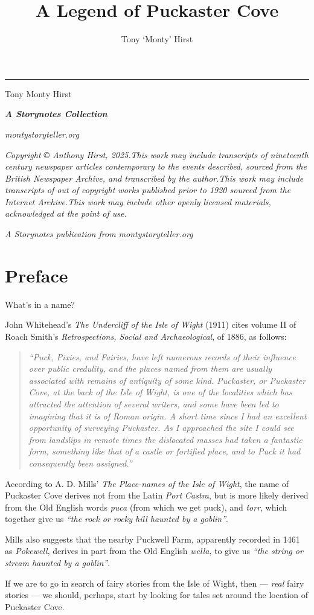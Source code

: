\documentclass[
  12pt,
  a5paper,
  twoside]{book}
\date{}
\title{A Legend of Puckaster Cove}
\author{Tony `Monty' Hirst}
\date{}
\makeatletter
\let\origtableofcontents\tableofcontents
\renewcommand{\tableofcontents}{%
    \cleardoublepage
    \pagestyle{plain}
    \origtableofcontents
    \cleardoublepage
    \pagestyle{normal} 
  }
\renewcommand{\maketitle}{%
  \thispagestyle{plain}
  \noindent\rule{\linewidth}{1pt}\par
  \begingroup
    \hypersetup{pdfauthor={\@author}, pdftitle={\@title}}%
  \endgroup
  \begin{flushright}
    \vspace{48pt}
    {\headingfont
    {\fontsize{44pt}{56pt}\selectfont \setlength{\baselineskip}{56pt}%
    \@title\par}
    \vspace{96pt}
    {\Large Tony {\textquotesingle}Monty{\textquotesingle} Hirst}\par
    
    \vspace{25pt}
    \@date \par

    }
  \end{flushright}

  \newpage
  \thispagestyle{plain}
  \thispagestyle{empty}

  \makeatletter

  \vspace*{\fill}

  \begin{center}
  {\large \textbf{\textit{A Storynotes Collection}}}\\[2em]
  \end{center}

  \vfill

  \begin{center}
  \large \textit{montystoryteller.org}
  \end{center}

  \vspace{2cm}

  \begin{center}
  \textit{Copyright {\copyright} Anthony Hirst, 2025.\linebreak\linebreak This work may include transcripts of nineteenth century newspaper articles contemporary to the events described, sourced from the British Newspaper Archive, and transcribed by the author.\linebreak\linebreak This work may include transcripts of out of copyright works published prior to 1920 sourced from the Internet Archive.\linebreak\linebreak This work may include other openly licensed materials, acknowledged at the point of use.
  }
  \end{center}

  \vspace*{\fill}

  \begin{center}
    \textit{A Storynotes publication from montystoryteller.org}
  \end{center}
  \makeatother

  \setcounter{footnote}{0}
  \let\thanks\relax\let\maketitle\relax
}
\renewcommand*\contentsname{Table of contents}
\newcommand\contentsname{Table of contents}
\makeatother
\begin{document}
\frontmatter
\maketitle

\renewcommand*\contentsname{Contents}
{
\setcounter{tocdepth}{0}
\tableofcontents
}

\mainmatter
{}

\chapter{Preface}\label{preface}

What's in a name?

John Whitehead's \emph{The Undercliff of the Isle of Wight} (1911) cites
volume II of Roach Smith's \emph{Retrospections, Social and
Archaeological}, of 1886, as follows:

\begin{quote}
\emph{``Puck, Pixies, and Fairies, have left numerous records of their
influence over public credulity, and the places named from them are
usually associated with remains of antiquity of some kind. Puckaster, or
Puckaster Cove, at the back of the Isle of Wight, is one of the
localities which has attracted the attention of several writers, and
some have been led to imagining that it is of Roman origin. A short time
since I had an excellent opportunity of surveying Puckaster. As I
approached the site I could see from landslips in remote times the
dislocated masses had taken a fantastic form, something like that of a
castle or fortified place, and to Puck it had consequently been
assigned.''}
\end{quote}

According to A. D. Mills' \emph{The Place-names of the Isle of Wight},
the name of Puckaster Cove derives not from the Latin \emph{Port
Castra}, but is more likely derived from the Old English words
\emph{puca} (from which we get puck), and \emph{torr}, which together
give us \emph{``the rock or rocky hill haunted by a goblin''}.

Mills also suggests that the nearby Puckwell Farm, apparently recorded
in 1461 as \emph{Pokewell}, derives in part from the Old English
\emph{wella}, to give us \emph{``the string or stream haunted by a
goblin''}.

If we are to go in search of fairy stories from the Isle of Wight, then
--- \emph{real} fairy stories --- we should, perhaps, start by looking
for tales set around the location of Puckaster Cove.
\end{document}
